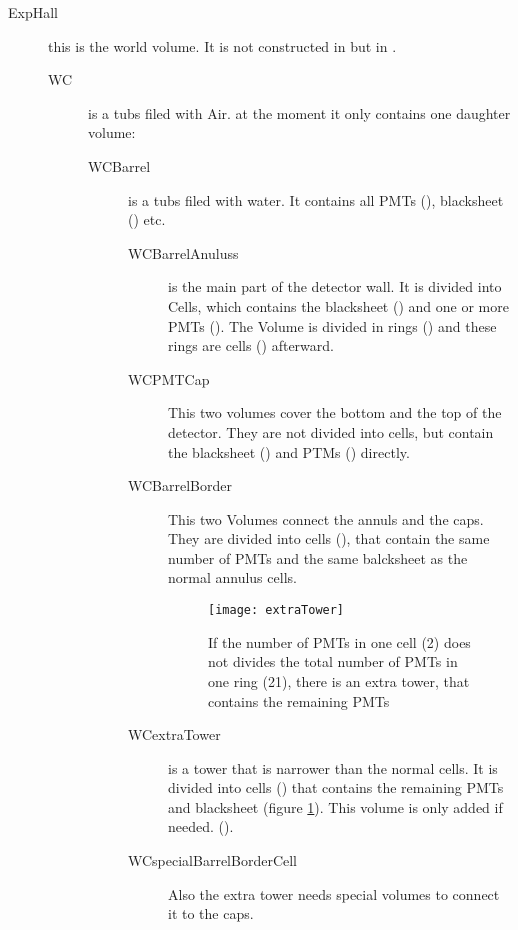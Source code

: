 \begin{description}
 \item[ExpHall] this is the world volume. It is not constructed in  
 but in .
 \begin{description}
  \item[WC] is a tubs filed with Air. at the moment it 
        only contains one daughter volume:
  \begin{description}
   \item[WCBarrel] is a tubs filed with water. It contains all PMTs
    (), blacksheet () etc.
   \begin{description}
    \item[WCBarrelAnuluss] is the main part of the detector wall. It is 
      divided into Cells, which contains the blacksheet () and one or 
      more PMTs (). 
      The Volume is divided in rings () and these rings 
      are cells  () afterward. 
    \item[WCPMTCap] This two volumes cover the bottom and the top of the 
     detector. They are not divided into cells, but contain the blacksheet
      () and PTMs
      () directly.
    \item[WCBarrelBorder] This two Volumes connect the annuls and the caps. 
      They are divided into cells (), that contain the same number of PMTs and the same
    balcksheet as the normal annulus cells.
    
\begin{figure}
   \begin{center}
\texttt{[image: extraTower]} 
  \end{center}
\caption{If the number of PMTs in one cell (2) does not divides the total number of PMTs in one ring (21), there is an extra tower, that contains the remaining PMTs}\label{fig:extra}
\end{figure}

    \item[WCextraTower] is a tower that is narrower than the normal cells. It is divided 
     into cells () that contains the remaining PMTs and blacksheet (figure \ref{fig:extra}). This volume is only added if needed.
     ().
    \item[WCspecialBarrelBorderCell] Also the extra tower needs special volumes to connect it 
    to the caps.
   \end{description}
  \end{description}
 \end{description}
\end{description}


